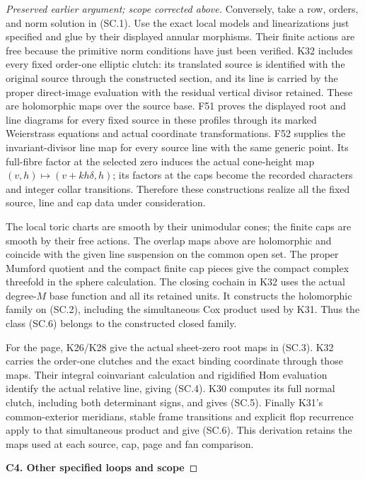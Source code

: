 \begin{proof}[Preserved earlier argument; scope corrected above]
Conversely, take a row, orders, and norm solution
in (SC.1). Use the exact local models and
linearizations just specified and glue by their
displayed annular morphisms. Their finite actions
are free because the primitive norm conditions
have just been verified. K32 includes every
fixed order-one elliptic clutch: its translated
source is identified with the original source
through the constructed section, and its line
is carried by the proper direct-image evaluation
with the residual vertical divisor retained.
These are holomorphic maps over the source base.
F51 proves the displayed root and line diagrams
for every fixed source in these profiles through
its marked Weierstrass equations and actual
coordinate transformations. F52 supplies the
invariant-divisor line map for every source line
with the same generic point. Its full-fibre
factor at the selected zero induces the actual
cone-height map
\((v,h)\mapsto(v+kh\delta,h)\); its factors at
the caps become the recorded characters and
integer collar transitions. Therefore these
constructions realize all the fixed source,
line and cap data under consideration.

The local toric charts are smooth by their
unimodular cones; the finite caps are smooth
by their free actions. The overlap maps above
are holomorphic and coincide with the given
line suspension on the common open set.
The proper Mumford quotient and the compact
finite cap pieces give the compact complex
threefold in the sphere calculation. The
closing cochain in K32 uses the actual
degree-\(M\) base function and all its retained
units. It constructs the holomorphic family
on (SC.2), including the simultaneous Cox
product used by K31. Thus the class (SC.6)
belongs to the constructed closed family.

For the page, K26/K28 give the actual
sheet-zero root maps in (SC.3). K32 carries
the order-one clutches and the exact
binding coordinate through those maps.
Their integral coinvariant calculation and
rigidified Hom evaluation identify the
actual relative line, giving (SC.4).
K30 computes its full normal clutch,
including both determinant signs, and
gives (SC.5). Finally K31's common-exterior
meridians, stable frame transitions and
explicit flop recurrence apply to that
simultaneous product and give (SC.6).
This derivation retains the maps used at
each source, cap, page and fan comparison.

\par

\medskip\noindent\textbf{C4. Other specified loops and scope}


\end{proof}
